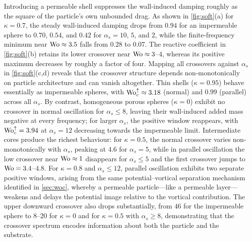 Introducing a permeable shell suppresses the wall-induced damping roughly as the square of the particle's own unbounded
drag. As shown in \cref{fig:soft}(a) for $\kappa=0.7$, the steady wall-induced damping drops from $0.94$ for an
impermeable sphere to $0.70$, $0.54$, and $0.42$ for $\alpha_s=10$, $5$, and $2$, while the finite-frequency minimum near
$\mathrm{Wo}\approx3.5$ falls from $0.28$ to $0.07$.  The reactive coefficient in \cref{fig:soft}(b) retains its
lower crossover near $\mathrm{Wo}\approx3$--$4$, whereas its positive maximum decreases by roughly a factor of four. Mapping all
crossovers against $\alpha_s$ in \cref{fig:soft}(c,d) reveals that the crossover structure depends non-monotonically on
particle architecture and can vanish altogether. Thin shells ($\kappa=0.95$) behave essentially as impermeable spheres,
with $\mathrm{Wo}_c^{\uparrow}\approx3.18$ (normal) and $0.99$ (parallel) across all $\alpha_s$. By contrast, homogeneous porous
spheres ($\kappa=0$) exhibit no crossover in normal oscillation for $\alpha_s\le8$, leaving their wall-induced added mass
negative at every frequency; for larger $\alpha_s$, the positive window reappears, with $\mathrm{Wo}_c^{\uparrow}=3.94$ at
$\alpha_s=12$ decreasing towards the impermeable limit. Intermediate cores produce the richest behaviour: for
$\kappa=0.5$, the normal crossover varies non-monotonically with $\alpha_s$, peaking at $4.6$ for $\alpha_s=5$, while in
parallel oscillation the low crossover near $\mathrm{Wo}\approx1$ disappears for $\alpha_s\le5$ and the first crossover jumps to
$\mathrm{Wo}=3.4$--$4.8$. For $\kappa=0.8$ and $\alpha_s\le12$, parallel oscillation exhibits two separate positive windows,
arising from the same potential--vortical separation mechanism identified in \cref{sec:woc}, whereby a permeable
particle---like a permeable layer---weakens and delays the potential image relative to the vortical contribution. The
upper downward crossover also drops substantially, from $46$ for the impermeable sphere to $8$--$20$ for $\kappa=0$ and for
$\kappa=0.5$ with $\alpha_s\ge8$, demonstrating that the crossover spectrum encodes information about both the particle
and the substrate.

